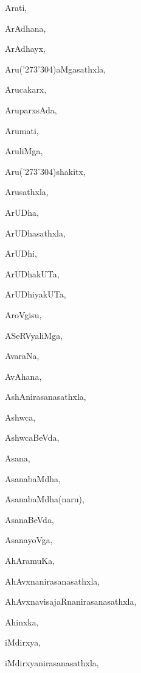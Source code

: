 \begin{multicols}{2}
{Arati}, \pageref{Arati}

{ArAdhana}, \pageref{ArAdhana}

{ArAdhayx}, \pageref{ArAdhayx}

{Aru(\char'273\char'304)aMgasathxla}, \pageref{Aru(273304)aMgasathxla}

{Arucakarx}, \pageref{Arucakarx}

{AruparxsAda}, \pageref{AruparxsAda}

{Arumati}, \pageref{Arumati}

{AruliMga}, \pageref{AruliMga}

{Aru(\char'273\char'304)shakitx}, \pageref{Aru(273304)shakitx}

{Arusathxla}, \pageref{Arusathxla}

{ArUDha}, \pageref{ArUDha}

{ArUDhasathxla}, \pageref{ArUDhasathxla}

{ArUDhi}, \pageref{ArUDhi}

{ArUDhakUTa}, \pageref{ArUDhakUTa}

{ArUDhiyakUTa}, \pageref{ArUDhiyakUTa}

{AroVgisu}, \pageref{AroVgisu}

{ASeRVyaliMga}, \pageref{ASeRVyaliMga}

{AvaraNa}, \pageref{AvaraNa}

{AvAhana}, \pageref{AvAhana}

{AshAnirasanasathxla}, \pageref{AshAnirasanasathxla}

{Ashwca}, \pageref{Ashwca}

{AshwcaBeVda}, \pageref{AshwcaBeVda}

{Asana}, \pageref{Asana}

{AsanabaMdha}, \pageref{AsanabaMdha}

{AsanabaMdha(naru)}, \pageref{AsanabaMdha(naru)}

{AsanaBeVda}, \pageref{AsanaBeVda}

{AsanayoVga}, \pageref{AsanayoVga}

{AhAramuKa}, \pageref{AhAramuKa}

{AhAvxnanirasanasathxla}, \pageref{AhAvxnanirasanasathxla}

{AhAvxnavisajaRnanirasanasathxla}, \pageref{AhAvxnavisajaRnanirasanasathxla}

{Ahinxka}, \pageref{Ahinxka}

{iMdirxya}, \pageref{iMdirxya}

{iMdirxyanirasanasathxla}, \pageref{iMdirxyanirasanasathxla}


\end{multicols}
